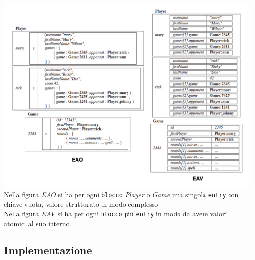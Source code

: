 \includegraphics[width=1.15\textwidth]{img/eao:eav}
\\
Nella figura \emph{EAO} si ha per ogni \texttt{blocco} \emph{Player} o \emph{Game} una singola \texttt{entry} con chiave vuota,
valore strutturato in modo complesso \\
Nella figura \emph{EAV} si ha per ogni \texttt{blocco} piú \texttt{entry} in modo da avere valori atomici al suo interno

\subsection{Implementazione}

